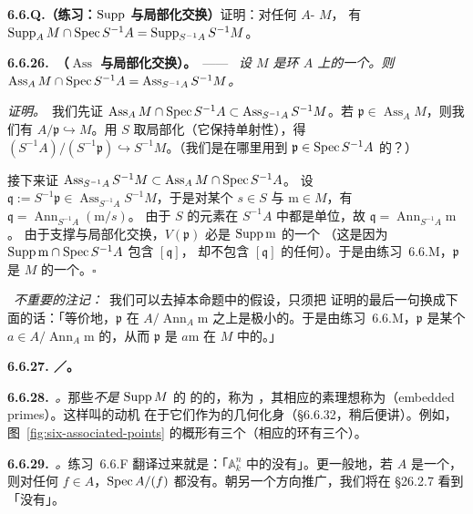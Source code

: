\textbf{6.6.Q.（练习：$\operatorname{Supp}$ 与局部化交换）}\quad 证明：对任何 $A$-\trModule{} $M$，
有 $\operatorname{Supp}_A M\cap\operatorname{Spec} S^{-1}A=\operatorname{Supp}_{S^{-1}A}S^{-1}M$。

\textbf{6.6.26.\ \trhProposition{}（$\operatorname{Ass}$ 与局部化交换）。}\ ——\ %
\emph{设 $M$ 是\trNoetherian{}环 $A$ 上的一个\trFinitelyGenerated{}\trModule。则
$\operatorname{Ass}_A M\cap\operatorname{Spec} S^{-1}A=\operatorname{Ass}_{S^{-1}A}S^{-1}M$。}

\emph{证明。}\ 我们先证 $\operatorname{Ass}_A M\cap\operatorname{Spec} S^{-1}A\subset
\operatorname{Ass}_{S^{-1}A}S^{-1}M$。若 $\mathfrak{p}\in\operatorname{Ass}_A M$，则我们有%
\trInclusionMap{} $A/\mathfrak{p}\hookrightarrow M$。用 $S$ 取局部化（它保持单射性），得
$(S^{-1}A)/(S^{-1}\mathfrak{p})\hookrightarrow S^{-1}M$。（我们是在哪里用到
$\mathfrak{p}\in\operatorname{Spec} S^{-1}A$ 的？）

接下来证 $\operatorname{Ass}_{S^{-1}A}S^{-1}M\subset\operatorname{Ass}_A M\cap\operatorname{Spec} S^{-1}A$。
设 $\mathfrak{q}:=S^{-1}\mathfrak{p}\in\operatorname{Ass}_{S^{-1}A}S^{-1}M$，于是对某个
$s\in S$ 与 $\mathrm{m}\in M$，有 $\mathfrak{q}=\operatorname{Ann}_{S^{-1}A}(\mathrm{m}/s)$。
由于 $S$ 的元素在 $S^{-1}A$ 中都是单位，故 $\mathfrak{q}=\operatorname{Ann}_{S^{-1}A}\mathrm{m}$。
由于支撑与局部化交换，$V(\mathfrak{p})$ 必是 $\operatorname{Supp}\mathrm{m}$ 的一个%
\trIrreducibleComponent{}（这是因为 $\operatorname{Supp}\mathrm{m}\cap\operatorname{Spec} S^{-1}A$ 包含 $[\mathfrak{q}]$，
却不包含 $[\mathfrak{q}]$ 的任何\trGenerization）。于是由练习~6.6.M，$\mathfrak{p}$ 是
$M$ 的一个\trAssociatedPrimeIdeal{}。\hfill$\square$

\hard\ \emph{不重要的注记：}\ 我们可以去掉本命题中的\trFinitelyGenerated{}假设，只须把
证明的最后一句换成下面的话：「等价地，$\mathfrak{p}$ 在 $A/\operatorname{Ann}_A\mathrm{m}$
之上是极小的。于是由练习~6.6.M，$\mathfrak{p}$ 是某个 $a\in A/\operatorname{Ann}_A\mathrm{m}$
的\trAnnihilatorIdeal{}，从而 $\mathfrak{p}$ 是 $a\mathrm{m}$ 在 $M$ 中的\trAnnihilatorIdeal{}。」

\textbf{6.6.27. \trEmbeddedPoint{}／\trEmbeddedPrime{}。}

\textbf{6.6.28.}\ \emph{\trhDefinition{}。}\quad 那些\emph{不是} $\operatorname{Supp} M$ 的%
\trIrreducibleComponent{}的\trGenericPoint{}的\trAssociatedPoint，称为\textbf{%
\trEmbeddedPoint}，其相应的素理想称为\textbf{\trEmbeddedPrime{}}（embedded primes）。这样叫的动机
在于它们作为\trEmbeddedPoint{}的几何化身（\S6.6.32，稍后便讲）。例如，%
图~\ref{fig:six-associated-points} 的概形有三个\trEmbeddedPoint{}（相应的环有三个\trEmbeddedPrime{}）。

\textbf{6.6.29.}\ \emph{\trhRemark{}。}\quad 练习~6.6.F 翻译过来就是：「$\mathbb{A}^n_k$
中的\trHypersurface{}没有\trEmbeddedPoint」。更一般地，若 $A$ 是一个\trUFD，则对任何
$f\in A$，$\operatorname{Spec} A/(f)$ 都没有\trEmbeddedPoint。朝另一个方向推广，我们将在 \S26.2.7
看到「\trCompleteIntersection{}没有\trEmbeddedPoint」。

